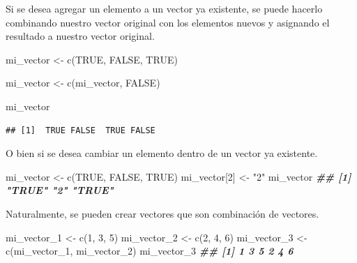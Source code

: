 \documentclass[
]{book}
\newenvironment{Shaded}{\begin{snugshade}}{\end{snugshade}}
\newcommand{\ConstantTok}[1]{\textcolor[rgb]{0.00,0.00,0.00}{#1}}
\newcommand{\DecValTok}[1]{\textcolor[rgb]{0.00,0.00,0.81}{#1}}
\newcommand{\DocumentationTok}[1]{\textcolor[rgb]{0.56,0.35,0.01}{\textbf{\textit{#1}}}}
\newcommand{\FunctionTok}[1]{\textcolor[rgb]{0.00,0.00,0.00}{#1}}
\newcommand{\NormalTok}[1]{#1}
\newcommand{\OtherTok}[1]{\textcolor[rgb]{0.56,0.35,0.01}{#1}}
\newcommand{\StringTok}[1]{\textcolor[rgb]{0.31,0.60,0.02}{#1}}
\begin{document}
Si se desea agregar un elemento a un vector ya existente, se puede hacerlo combinando nuestro vector original con los elementos nuevos y asignando el resultado a nuestro vector original.

\begin{Shaded}
\begin{Highlighting}[]
\NormalTok{mi\_vector }\OtherTok{\textless{}{-}} \FunctionTok{c}\NormalTok{(}\ConstantTok{TRUE}\NormalTok{, }\ConstantTok{FALSE}\NormalTok{, }\ConstantTok{TRUE}\NormalTok{)}

\NormalTok{mi\_vector }\OtherTok{\textless{}{-}} \FunctionTok{c}\NormalTok{(mi\_vector, }\ConstantTok{FALSE}\NormalTok{)}

\NormalTok{mi\_vector}
\end{Highlighting}
\end{Shaded}

\begin{verbatim}
## [1]  TRUE FALSE  TRUE FALSE
\end{verbatim}

O bien si se desea cambiar un elemento dentro de un vector ya existente.

\begin{Shaded}
\begin{Highlighting}[]
\NormalTok{mi\_vector }\OtherTok{\textless{}{-}} \FunctionTok{c}\NormalTok{(}\ConstantTok{TRUE}\NormalTok{, }\ConstantTok{FALSE}\NormalTok{, }\ConstantTok{TRUE}\NormalTok{)}
\NormalTok{mi\_vector[}\DecValTok{2}\NormalTok{] }\OtherTok{\textless{}{-}} \StringTok{"2"}
\NormalTok{mi\_vector}
\DocumentationTok{\#\# [1] "TRUE" "2"    "TRUE"}
\end{Highlighting}
\end{Shaded}

Naturalmente, se pueden crear vectores que son combinación de vectores.

\begin{Shaded}
\begin{Highlighting}[]
\NormalTok{mi\_vector\_1 }\OtherTok{\textless{}{-}} \FunctionTok{c}\NormalTok{(}\DecValTok{1}\NormalTok{, }\DecValTok{3}\NormalTok{, }\DecValTok{5}\NormalTok{)}
\NormalTok{mi\_vector\_2 }\OtherTok{\textless{}{-}} \FunctionTok{c}\NormalTok{(}\DecValTok{2}\NormalTok{, }\DecValTok{4}\NormalTok{, }\DecValTok{6}\NormalTok{)}
\NormalTok{mi\_vector\_3 }\OtherTok{\textless{}{-}} \FunctionTok{c}\NormalTok{(mi\_vector\_1, mi\_vector\_2)}
\NormalTok{mi\_vector\_3}
\DocumentationTok{\#\# [1] 1 3 5 2 4 6}
\end{Highlighting}
\end{Shaded}
\end{document}
